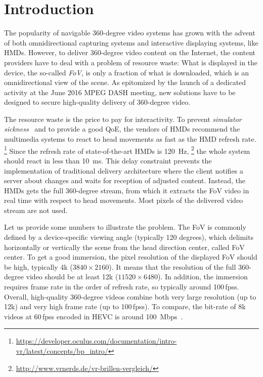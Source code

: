 \section{Introduction}
\label{sec:introduction}


The popularity of navigable 360-degree video systems
has grown with the advent of both omnidirectional capturing systems
and interactive displaying
systems, like \acp{HMD}.
However, to deliver 360-degree video content on the Internet, the content providers
have to deal with a problem of resource waste: What is displayed in the device,
the so-called \textit{\ac{FoV}}, is only a fraction of what is downloaded, which is an omnidirectional view of the scene.
As epitomized by the launch of a dedicated activity at the June 2016 MPEG \ac{DASH} meeting,
new solutions have to be designed to secure high-quality delivery of 360-degree video.

The resource waste is the price to pay for interactivity.
To prevent \emph{simulator sickness}~\cite{moss2011characteristics}
and to provide a good \ac{QoE}, the vendors of \acp{HMD} recommend the multimedia
systems to react
to head movements as fast as the \ac{HMD}
refresh rate.%
\footnote{\url{https://developer.oculus.com/documentation/intro-vr/latest/concepts/bp_intro/}}
Since the refresh rate of
state-of-the-art \acp{HMD} is \SI{120}{Hz},%
\footnote{\url{http://www.vrnerds.de/vr-brillen-vergleich/}}
the whole system should react in less than
\SI{10}{ms}. This delay constraint prevents the implementation of traditional delivery
architecture where the client notifies a server about changes and waits for reception
of adjusted content. Instead, the \acp{HMD} gets the full 360-degree stream, from which
it extracts the \ac{FoV} video in real time with respect to head movements. Most pixels
of the delivered video stream are not used.

Let us provide some numbers to illustrate the problem.
The \ac{FoV} is commonly defined by
a device-specific viewing angle (typically 120 degrees), which delimits horizontally or
vertically the scene from the head direction center, called \ac{FoV} center. To get a good
immersion, the pixel
resolution of
the displayed \ac{FoV} should be high, typically 4k ($3840\times2160$). It means that
the resolution of the full 360-degree video should be at least 12k ($11520\times6480$).
In addition, the immersion requires frame rate in the order of refresh rate, so
typically around 100\,\acp{fps}.
Overall, high-quality 360-degree videos combine both very large resolution (up to 12k)
and very high frame rate (up to 100\,\acp{fps}). To compare, the bit-rate of 8k videos
at 60\,\acp{fps} encoded in \ac{HEVC} is around \SI{100}{Mbps}~\cite{7398367}.



